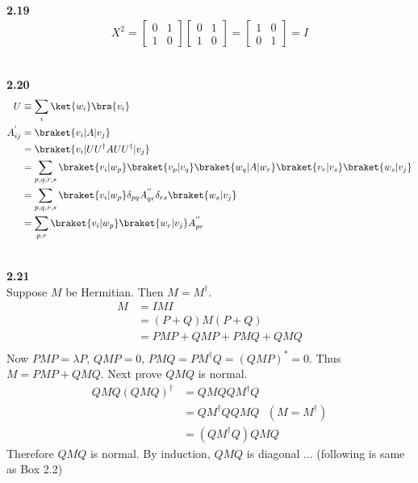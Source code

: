 \documentclass[10pt]{book}
\newcommand{\Textbf}[1]{\hspace{3mm}\\ \textbf{#1}\\}
\begin{document}
	
	
	
	\Textbf{2.19}
	\begin{equation}
\begin{aligned}
		X^2 = \begin{bmatrix}
			0 & 1 \\
			1 & 0
		\end{bmatrix}
		\begin{bmatrix}
			0 & 1 \\
			1 & 0
		\end{bmatrix}
		= \begin{bmatrix}
			1 & 0 \\
			0 & 1
		\end{bmatrix} = I
	\end{aligned}
\end{equation}
	
	
	
	\Textbf{2.20}
	\begin{equation}
\begin{aligned}
		U &\equiv \sum_i \ket{w_i}\bra{v_i}\\
		A_{ij}^{'} &= \braket{v_i | A | v_j}\\
		&= \braket{v_i | UU^\dagger A UU^\dagger | v_j}\\
		&= \sum_{p,q,r,s} \braket{v_i | w_p} \braket{v_p | v_q} \braket{w_q | A | w_r} \braket{v_r | v_s} \braket{w_s | v_j}\\
		&= \sum_{p,q,r,s} \braket{v_i | w_p} \delta_{pq} A_{qr}^{''} \delta_{rs}  \braket{w_s | v_j}\\
		&= \sum_{p,r}  \braket{v_i | w_p}  \braket{w_r | v_j} A_{pr}^{''}
	\end{aligned}
\end{equation}
	
	
	\Textbf{2.21}
	
	Suppose $M$ be Hermitian. Then $M = M^\dagger$.
	\begin{equation}
\begin{aligned}
		M &= IMI\\
		&= (P+Q) M (P+Q)\\
		&= PMP + QMP + PMQ + QMQ\\
	\end{aligned}
\end{equation}
	Now $PMP = \lambda P$, $QMP = 0$, $PMQ = PM^\dagger Q = (QMP)^* = 0$.
	Thus $M = PMP + QMQ$.
	Next prove $QMQ$ is normal.
	\begin{equation}
\begin{aligned}
		QMQ (QMQ)^\dagger &= QMQ QM^\dagger Q\\
		&= QM^\dagger Q QMQ ~~~ (M = M^\dagger)\\
		&= (QM^\dagger Q) QMQ
	\end{aligned}
\end{equation}
	Therefore $QMQ$ is normal.
	By induction, $QMQ$ is diagonal ... (following is same as Box 2.2)
	
\end{document}
